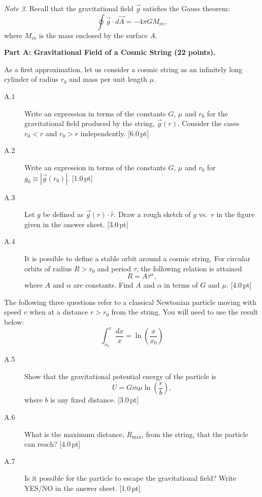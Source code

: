 \emph{Note 3.} Recall that the gravitational field $\vec{g}$ satisfies the
Gauss theorem:
\[ \oint \vec{g}\cdot d\vec{A} = -4\pi G M_{in}, \]
where $M_{in}$ is the mass enclosed by the surface $A$.

\medskip
\textbf{Part A: Gravitational Field of a Cosmic String (22 points).}

As a first approximation, let us consider a cosmic string as an infinitely
long cylinder of radius $r_0$ and mass per unit length $\mu$.

\begin{description}
\item[A.1] Write an expression in terms of the constants $G$, $\mu$ and $r_0$
  for the gravitational field produced by the string, $\vec{g}(r)$. Consider
  the cases $r_0 < r$ and $r_0 > r$ independently. \hfill[6.0\,pt]
\item[A.2] Write an expression in terms of the constants $G$, $\mu$ and $r_0$
  for $g_0 \equiv |\vec{g}(r_0)|$. \hfill[1.0\,pt]
\item[A.3] Let $g$ be defined as $\vec{g}(r)\cdot\hat{r}$. Draw a rough sketch
  of $g$ vs.\ $r$ in the figure given in the answer sheet. \hfill[3.0\,pt]
\item[A.4] It is possible to define a stable orbit around a cosmic string. For
  circular orbits of radius $R > r_0$ and period $\tau$, the following
  relation is attained
  \[ R = A\tau^\alpha, \]
  where $A$ and $\alpha$ are constants. Find $A$ and $\alpha$ in terms of $G$
  and $\mu$. \hfill[4.0\,pt]
\end{description}

The following three questions refer to a classical Newtonian particle moving
with speed $v$ when at a distance $r > r_0$ from the string. You will need to
use the result below:
\[ \int_{x_0}^{x}\frac{dx}{x} = \ln\left(\frac{x}{x_0}\right) \]

\begin{description}
\item[A.5] Show that the gravitational potential energy of the particle is
  \[ U = Gm\mu\ln\left(\frac{r}{b}\right), \]
  where $b$ is any fixed distance. \hfill[3.0\,pt]
\item[A.6] What is the maximum distance, $R_{\max}$, from the string, that the
  particle can reach? \hfill[4.0\,pt]
\item[A.7] Is it possible for the particle to escape the gravitational field?
  Write YES/NO in the answer sheet. \hfill[1.0\,pt]
\end{description}


